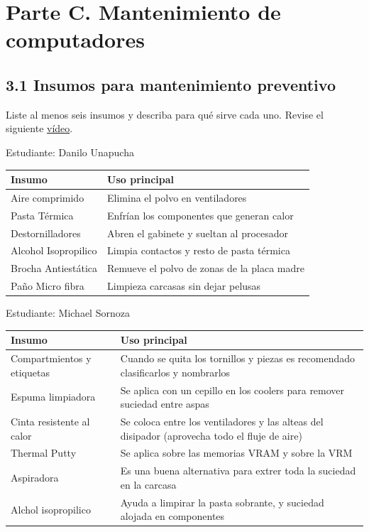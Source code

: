 \documentclass{article}
\begin{document}
\section{Parte C. Mantenimiento de computadores}
\label{sec:org703f9ba}

\subsection{3.1 Insumos para mantenimiento preventivo}
\label{sec:orgbccee02}
Liste al menos seis insumos y describa para qué sirve cada
uno. Revise el siguiente \href{https://youtu.be/3ri1BMV7XTM?si=bjYoDUUKuMWwj4Qg}{vídeo}.

Estudiante: Danilo Unapucha

\begin{center}
\begin{tabular}{ll}
Insumo & Uso principal\\[0pt]
\hline
Aire comprimido & Elimina el polvo en ventiladores\\[0pt]
Pasta Térmica & Enfrían los componentes que generan calor\\[0pt]
Destornilladores & Abren el gabinete y sueltan al procesador\\[0pt]
Alcohol Isopropilico & Limpia contactos y resto de pasta térmica\\[0pt]
Brocha Antiestática & Remueve el polvo de zonas de la placa madre\\[0pt]
Paño Micro fibra & Limpieza carcasas sin dejar pelusas\\[0pt]
\end{tabular}
\end{center}

Estudiante: Michael Sornoza

\begin{center}
\begin{tabular}{ll}
Insumo & Uso principal\\[0pt]
\hline
Compartmientos y etiquetas & Cuando se quita los tornillos y piezas es recomendado clasificarlos y nombrarlos\\[0pt]
Espuma limpiadora & Se aplica con un cepillo en los coolers para remover suciedad entre aspas\\[0pt]
Cinta resistente al calor & Se coloca entre los ventiladores y las alteas del disipador (aprovecha todo el fluje de aire)\\[0pt]
Thermal Putty & Se aplica sobre las memorias VRAM y sobre la VRM\\[0pt]
Aspiradora & Es una buena alternativa para extrer toda la suciedad en la carcasa\\[0pt]
Alchol isopropilico & Ayuda a limpirar la pasta sobrante, y suciedad alojada en componentes\\[0pt]
\end{tabular}
\end{center}
\end{document}

